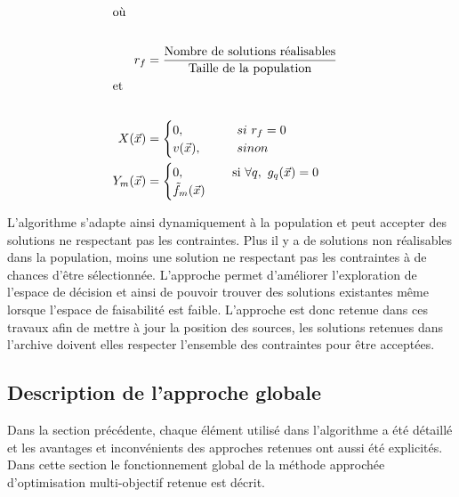 \begin{align*}
  \shortintertext{où} \\
    r_{f} &= \frac{\text{Nombre de solutions réalisables}}{\text{Taille de la population}} \\
  \shortintertext{et} \\
  X(\vec{x})     &= \begin{cases}
                0,          \qquad     & si\  r_{f} = 0\\
                v(\vec{x}), \qquad     & sinon\\
                \end{cases} \\
  Y_{m}(\vec{x}) &= \begin{cases}
                    0,          \quad \qquad & \text{si} \ \forall q, \ g_{q}(\vec{x}) = 0\\
                      \tilde{f}_{m}(\vec{x})  \\
            \end{cases}\\
\end{align*}

L’algorithme s’adapte ainsi dynamiquement à la population et peut accepter des
solutions ne respectant pas les contraintes. Plus il y a de solutions non
réalisables dans la population, moins une solution ne respectant pas les contraintes à
de chances d’être sélectionnée. L’approche permet d’améliorer l’exploration de
l’espace de décision et ainsi de pouvoir trouver des solutions existantes même
lorsque l’espace de faisabilité est faible.
L’approche est donc retenue dans ces travaux afin de mettre à jour la position des
sources, les solutions retenues dans l’archive doivent elles respecter
l’ensemble des contraintes pour être acceptées.


\subsection{Description de l’approche globale} %
\label{sub:description_de_l_approche_globale}
Dans la section précédente, chaque élément utilisé dans l’algorithme a été détaillé et
les avantages et inconvénients des approches retenues ont aussi été explicités.
Dans cette section le fonctionnement global de la méthode approchée d’optimisation
multi-objectif retenue est décrit.

